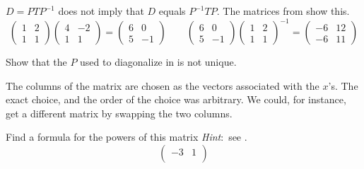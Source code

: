 \begin{exercises}
\begin{answer}
\begin{exparts}
          $D=PTP^{-1}$ does not imply that $D$ equals $P^{-1}TP$.
          The matrices from  show this.
          \begin{equation*}
            \begin{pmatrix}
              1  &2  \\
              1  &1
            \end{pmatrix}
            \begin{pmatrix}
              4  &-2  \\
              1  &1
            \end{pmatrix}
            =
            \begin{pmatrix}
              6  &0  \\
              5  &-1
            \end{pmatrix}
            \qquad
            \begin{pmatrix}
              6  &0  \\
              5  &-1
            \end{pmatrix}
            \begin{pmatrix}
              1  &2  \\
              1  &1
            \end{pmatrix}^{-1}
            =
            \begin{pmatrix}
              -6  &12  \\
              -6  &11
            \end{pmatrix}
          \end{equation*}
     \end{exparts}
   \end{answer}
  \item 
    Show that the $P$ used to diagonalize in  
     is not unique.
    \begin{answer}
      The columns of the matrix are chosen as the vectors associated with
      the $x$'s.
      The exact choice, and the order of the choice was
      arbitrary.
      We could, for instance, get a different matrix by swapping 
      the two columns.
    \end{answer}
  \item 
    Find a formula for the powers of this matrix
    \textit{Hint}:~see .
    \begin{equation*}
      \begin{pmatrix}
        -3  &1  \\

\end{pmatrix}
\end{equation*}
\end{exercises}
